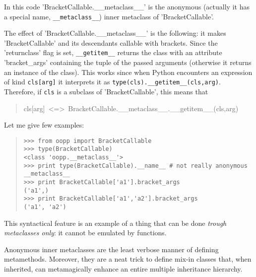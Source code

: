 \documentclass[10pt,english]{article}
\begin{document}
In this code 'BracketCallable.{\_}{\_}metaclass{\_}{\_}' is the anonymous (actually 
it has a special name, \texttt{{\_}{\_}metaclass{\_}{\_}}) inner metaclass of 'BracketCallable'.

The effect of 'BracketCallable.{\_}{\_}metaclass{\_}{\_}' is the following: it makes
'BracketCallable' and its descendants callable with brackets. Since
the 'returnclass' flag is set, \texttt{{\_}{\_}getitem{\_}{\_}} returns the class
with an attribute 'bracket{\_}args' containing the tuple of the passed
arguments (otherwise it returns an instance of the class).
This works since when 
Python encounters an expression of kind \texttt{cls[arg]} it interprets it 
as  \texttt{type(cls).{\_}{\_}getitem{\_}{\_}(cls,arg)}. Therefore, if \texttt{cls} is a subclass 
of  'BracketCallable', this means that
\begin{quote}
\begin{ttfamily}\begin{flushleft}
\mbox{cls[arg]~<=>~BracketCallable.{\_}{\_}metaclass{\_}{\_}.{\_}{\_}getitem{\_}{\_}(cls,arg)}
\end{flushleft}\end{ttfamily}
\end{quote}

Let me give few examples:
\begin{quote}
\begin{verbatim}>>> from oopp import BracketCallable
>>> type(BracketCallable)
<class 'oopp.__metaclass__'>
>>> print type(BracketCallable).__name__ # not really anonymous
__metaclass__
>>> print BracketCallable['a1'].bracket_args
('a1',)
>>> print BracketCallable['a1','a2'].bracket_args
('a1', 'a2')\end{verbatim}
\end{quote}

This syntactical feature is an example of a thing that can be done 
\emph{trough metaclasses only}: it cannot be emulated by functions.

Anonymous inner metaclasses are the least verbose manner 
of defining metamethods. Moreover, they are a neat trick to define 
mix-in classes that, when inherited, can metamagically enhance 
an entire multiple inheritance hierarchy.
\end{document}
